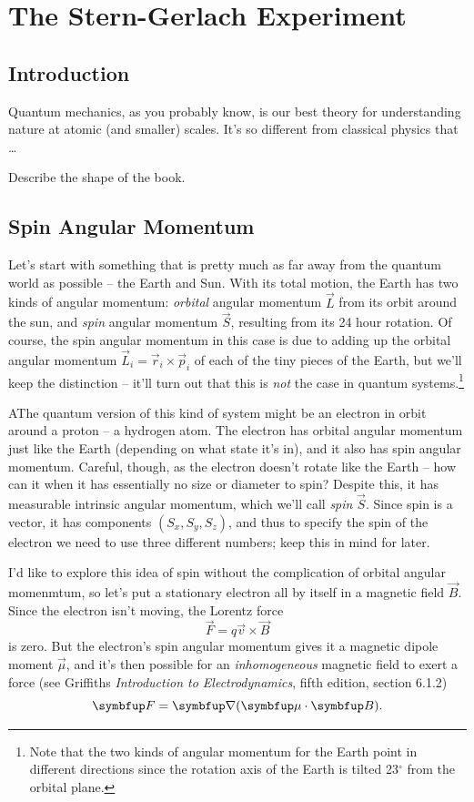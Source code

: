 \chapter{The Stern-Gerlach Experiment}

\section{Introduction}

Quantum mechanics, as you probably know, is our best theory for understanding nature at atomic (and smaller) scales.  It's so different from classical physics that \dots

Describe the shape of the book.


\section{Spin Angular Momentum}

Let's start with something that is pretty much as far away from the quantum world as possible -- the Earth and Sun.  With its total motion, the Earth has two kinds of angular momentum:  \emph{orbital} angular momentum $\vec{L}$ from its orbit around the sun, and \emph{spin} angular momentum $\vec{S}$, resulting from its 24 hour rotation.  Of course, the spin angular momentum in this case is due to adding up the orbital angular momentum $\vec{L}_i = \vec{r}_i \times \vec{p}_i$ of each of the tiny pieces of the Earth, but we'll keep the distinction -- it'll turn out that this is \emph{not} the case in quantum systems.\footnote{Note that the two kinds of angular momentum for the Earth point in different directions since the rotation axis of the Earth is tilted 23$^\circ$ from the orbital plane.}

AThe quantum version of this kind of system might be an electron in orbit around a proton -- a hydrogen atom.  The electron has orbital angular momentum just like the Earth (depending on what state it's in), and it also has spin angular momentum.  Careful, though, as the electron doesn't rotate like the Earth -- how can it when it has essentially no size or diameter to spin?  Despite this, it has measurable intrinsic angular momentum, which we'll call \emph{spin} $\vec{S}$.  Since spin is a vector, it has components $(S_x, S_y, S_z)$, and thus to specify the spin of the electron we need to use three different numbers; keep this in mind for later.

I'd like to explore this idea of spin without the complication of orbital angular momenmtum, so let's put a stationary electron all by itself in a magnetic field $\vec{B}$.  Since the electron isn't moving, the Lorentz force
\[
\vec{F} = q\vec{v} \times \vec{B}
\]
is zero.  But the electron's spin angular momentum gives it a magnetic dipole moment $\vec{\mu}$, and it's then possible for an \emph{inhomogeneous} magnetic field to exert a force (see Griffiths \emph{Introduction to Electrodynamics}, fifth edition, section 6.1.2)
\begin{equation}
\vec{F} = \grad (\vec{\mu} \cdot \vec{B}).
\label{eq_force_inhomo}
\end{equation}

